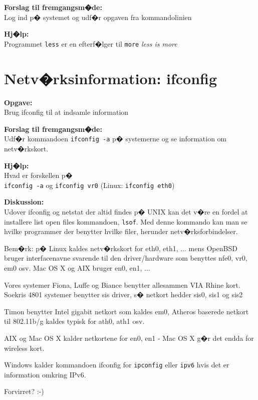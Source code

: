 \documentclass[a4paper,11pt,notitlepage]{oevelser}
\begin{document}
{\bfseries Forslag til fremgangsm�de:}\\
Log ind p� systemet og udf�r opgaven fra kommandolinien

{\bfseries Hj�lp:}\\
Programmet \verb+less+ er en efterf�lger til \verb+more+
\emph{less is more}





\chapter{Netv�rksinformation: ifconfig}
\label{ex:network-ifconfig}

{\bfseries Opgave:}\\
Brug ifconfig til at indsamle information

{\bfseries Forslag til fremgangsm�de:}\\
Udf�r kommandoen \verb+ifconfig -a+ p� systemerne og
se information om netv�rkskort.

{\bfseries Hj�lp:}\\
Hvad er forskellen p�\\
\verb+ifconfig -a+ og \verb+ifconfig vr0+ (Linux: \verb+ifconfig eth0+)

{\bfseries Diskussion:}\\
Udover ifconfig og netstat der altid findes p� UNIX kan det v�re en
fordel at installere list open files kommandoen, \verb+lsof+. Med
denne kommando kan man se hvilke programmer der benytter hvilke filer,
herunder netv�rksforbindelser.

Bem�rk: p� Linux kaldes netv�rkskort for eth0, eth1, ... mens OpenBSD
bruger interfacenavne svarende til den driver/hardware som benyttes
nfe0, vr0, em0 osv. Mac OS X og AIX bruger en0, en1, ...

Vores systemer Fiona, Luffe og Biance benytter allesammen VIA Rhine kort.
Soekris 4801 systemer benytter sis driver, s� netkort hedder sis0, sis1 og sis2

Timon benytter Intel gigabit netkort som kaldes em0, Atheros baserede netkort til 802.11b/g kaldes typisk for ath0, ath1 osv.

AIX og Mac OS X kalder netkortene for en0, en1 - Mac OS X g�r det endda for wireless kort.

Windows kalder kommandoen ifconfig for \verb+ipconfig+ eller \verb+ipv6+ hvis det er information omkring IPv6.

Forvirret? :-)
\end{document}
